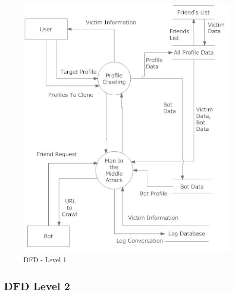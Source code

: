 \begin{figure}[H]
\centering
\includegraphics[scale=0.8]{project/diagrams/dfd1}
\caption{DFD - Level 1}
\label{fig:dfd1}
\end{figure}

\subsection{DFD Level 2}

